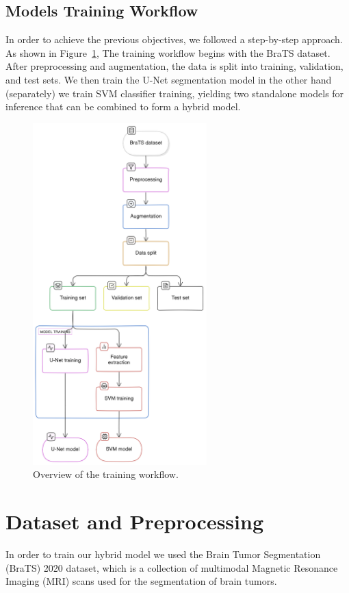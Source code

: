 \subsection{Models Training Workflow}
In order to achieve the previous objectives, we followed a step-by-step approach. As shown in Figure~\ref{fig:training}, The training workflow begins with the BraTS dataset. After preprocessing and augmentation, the data is split into training, validation, and test sets. We then train the U-Net segmentation model  in the other hand (separately) we train SVM classifier training, yielding two standalone models for inference that can be combined to form a hybrid model.

\begin{figure}[H]
  \centering
  \includegraphics[width=0.6\textwidth]{Images/Chapter3/training.png}
  \caption{Overview of the training workflow.}
  \label{fig:training}
\end{figure}

\section{Dataset and Preprocessing}
\label{sec:contribution-dataset}
In order to train our hybrid model we used the Brain Tumor Segmentation (BraTS) 2020 dataset, which is a collection of multimodal Magnetic Resonance Imaging (MRI) scans used for the segmentation of brain tumors.

